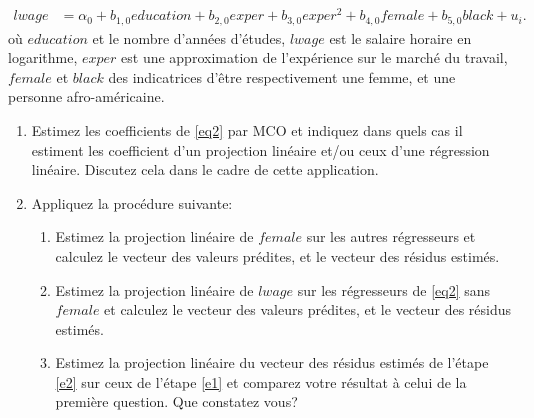\begin{enumerate}
\begin{align}
  lwage &=  \alpha_0 + b_{1, 0} education + b_{2, 0} exper + b_{3, 0} exper^2 + b_{4, 0} female +  b_{5, 0} black + u_i.
  \label{eq2}
\end{align}
où $education$ et le nombre d'années d'études, $lwage$ est le salaire horaire en logarithme, $exper$ est une approximation de l'expérience 
sur le marché du travail, $female$ et $black$ des indicatrices d'être respectivement une femme, et une personne afro-américaine.

\begin{enumerate}
\item Estimez les coefficients de \eqref{eq2} par MCO et indiquez dans quels cas il estiment les coefficient d'un projection linéaire et/ou
 ceux d'une régression linéaire. Discutez cela dans le cadre de cette application.
\item Appliquez la procédure suivante:
\begin{enumerate}[label=(\arabic*)]
  \item Estimez la projection linéaire de $female$ sur les autres régresseurs et calculez le vecteur des valeurs prédites, et le vecteur des résidus estimés.
  \label{e1}
  \item Estimez la projection linéaire de $lwage$ sur les régresseurs de \eqref{eq2} sans $female$ et calculez le vecteur des valeurs prédites, et le vecteur des résidus estimés.
  \label{e2}
  \item Estimez la projection linéaire du vecteur des résidus estimés de l'étape \ref{e2} sur ceux de l'étape \ref{e1} et 
  comparez votre résultat à celui de la première question. Que constatez vous?
\end{enumerate}
\end{enumerate}


\end{enumerate}














%
%
 